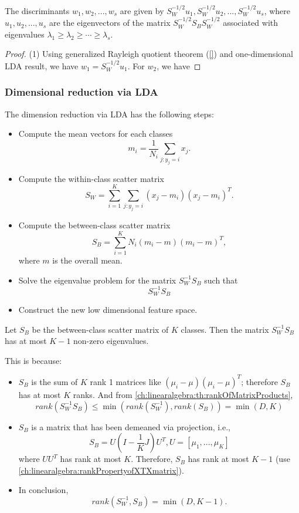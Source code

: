\begin{refsection}
\begin{lemma}
The discriminants $w_1,w_2,...,w_s$	are given by $S_W^{-1/2}u_1,S_W^{-1/2}u_2,...,S_W^{-1/2}u_s$, where $u_1,u_2,...,u_s$ are the eigenvectors of the matrix $S_W^{-1/2}S_BS_W^{-1/2}$ associated with eigenvalues $\lambda_1\geq \lambda_2 \geq \cdots \geq \lambda_s$.
\end{lemma}
\begin{proof}
(1) Using generalized Rayleigh quotient theorem (\autoref{}) and one-dimensional LDA result, we have 
$w_1  = S_W^{-1/2}u_1$.
For $w_2$, we have  	
\end{proof}


\subsubsection{Dimensional reduction via LDA}

\begin{method}
	The dimension reduction via LDA has the following steps:
	\begin{itemize}
		\item Compute the mean vectors for each classes
		$$m_i = \frac{1}{N_i}\sum_{j:y_j=i} x_j.$$
		\item Compute the within-class scatter matrix
		$$S_W = \sum_{i=1}^K\sum_{j:y_j=i}  (x_j - m_i)(x_j - m_i)^T.$$
		\item Compute the between-class scatter matrix
		$$S_B = \sum_{i=1}^K N_i (m_i - m)(m_i - m)^T,$$
		where $m$ is the overall mean.
		\item Solve the eigenvalue problem for the matrix $S_W^{-1}S_B$ such that
		$$S_W^{-1}S_B$$
		\item Construct the new low dimensional feature space.
		
	\end{itemize}	
\end{method}


\begin{remark}
Let $S_B$ be the between-class scatter matrix of $K$ classes. Then the matrix $S_W^{-1}S_B$ has at most $K-1$ non-zero eigenvalues.

This is because:
\begin{itemize}
	\item $S_B$ is the sum of $K$ rank 1 matrices like $(\mu_i - \mu)(\mu_i - \mu)^T$; therefore $S_B$ has at most $K$ ranks. And from \autoref{ch:linearalgebra:th:rankOfMatrixProducts}, $$rank(S_W^{-1}S_B)\leq \min(rank(S_W^{-1}),rank(S_B)) = \min(D, K)$$
	\item $S_B$ is a matrix that has been demeaned via projection, i.e., 
	$$S_B = U(I - \frac{1}{K}J)U^T, U = [\mu_1,...,\mu_K]$$
	where $UU^T$ has rank at most $K$. Therefore, $S_B$ has rank at most $K-1$ (use \autoref{ch:linearalgebra:rankPropertyofXTXmatrix}). 
	\item In conclusion, 
	$$rank(S_W^{-1},S_B) = \min(D, K-1).$$
\end{itemize} 		
\end{remark}




\end{refsection}
